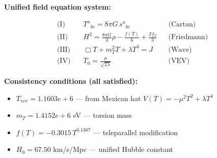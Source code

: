 
\textbf{Unified field equation system:}

\begin{align}
  \text{(I)} \quad & T^a{}_{bc} = 8\pi G \, s^a{}_{bc} && \text{(Cartan)} \\
  \text{(II)} \quad & H^2 = \frac{8\pi G}{3}\rho - \frac{f(T)}{6} + \frac{Tf_T}{3} && \text{(Friedmann)} \\
  \text{(III)} \quad & \Box T + m_T^2 T + \lambda T^3 = J && \text{(Wave)} \\
  \text{(IV)} \quad & T_0 = \frac{\mu}{\sqrt{2\lambda}} && \text{(VEV)}
\end{align}

\textbf{Consistency conditions (all satisfied):}
\begin{itemize}
  \item $T_{\text{vev}} = 1.1603e+6$ — from Mexican hat $V(T) = -\mu^2 T^2 + \lambda T^4$
  \item $m_T = 1.4152e+6$ eV — torsion mass
  \item $f(T) = -0.3015 \, T^{0.1367}$ — teleparallel modification
  \item $H_0 = 67.50$ km/s/Mpc — unified Hubble constant
\end{itemize}
